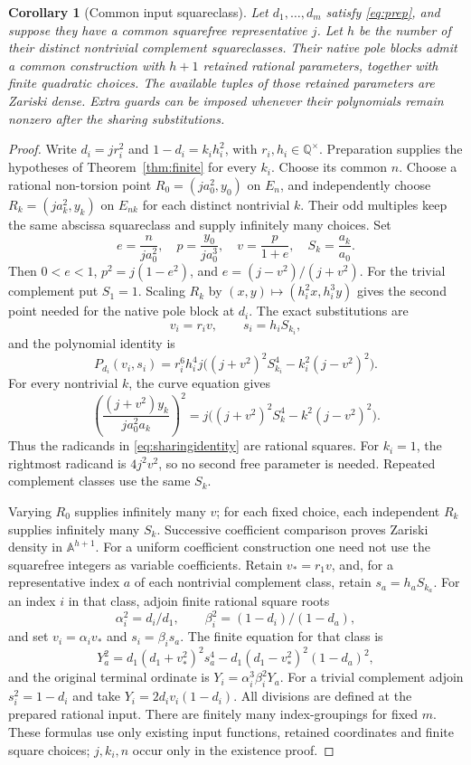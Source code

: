 \documentclass[11pt,a4paper]{article}
\newtheorem{corollary}[theorem]{Corollary}
\theoremstyle{remark}\newtheorem{remark}[theorem]{Remark}
\newcommand{\Q}{\mathbb Q}\newcommand{\Z}{\mathbb Z}\newcommand{\F}{\mathbb F}
\begin{document}
\begin{corollary}[Common input squareclass]\label{cor:sharing}
Let $d_1,\ldots,d_m$ satisfy \eqref{eq:prep}, and suppose they
have a common squarefree representative $j$. Let $h$ be the number
of their distinct nontrivial complement squareclasses.
Their native pole blocks admit a common construction with $h+1$
retained rational parameters, together with finite quadratic choices.
The available tuples of those retained parameters are Zariski dense.
Extra guards can be imposed whenever their polynomials remain
nonzero after the sharing substitutions.
\end{corollary}
\begin{proof}
Write $d_i=j r_i^2$ and $1-d_i=k_i h_i^2$, with
$r_i,h_i\in\Q^\times$. Preparation supplies the hypotheses of
Theorem~\ref{thm:finite} for every $k_i$. Choose its common $n$.
Choose a rational non-torsion point
$R_0=(j a_0^2,y_0)$ on $E_n$, and independently choose
$R_k=(j a_k^2,y_k)$ on $E_{nk}$ for each distinct nontrivial $k$.
Their odd multiples keep the same abscissa squareclass and supply
infinitely many choices. Set
\[
 e=\frac{n}{j a_0^2},\quad
 p=\frac{y_0}{j a_0^3},\quad v=\frac{p}{1+e},\quad
 S_k=\frac{a_k}{a_0}.
\]
Then $0<e<1$, $p^2=j(1-e^2)$, and
$e=(j-v^2)/(j+v^2)$. For the trivial complement put $S_1=1$.
Scaling $R_k$ by $(x,y)\mapsto(h_i^2x,h_i^3y)$ gives the
second point needed for the native pole block at $d_i$.
The exact substitutions are
\[
 v_i=r_i v,\qquad s_i=h_iS_{k_i},
\]
and the polynomial identity is
\begin{equation}\label{eq:sharingidentity}
 P_{d_i}(v_i,s_i)=r_i^6h_i^4j
 \bigl((j+v^2)^2S_{k_i}^4-k_i^2(j-v^2)^2\bigr).
\end{equation}
For every nontrivial $k$, the curve equation gives
\[
 \left(\frac{(j+v^2)y_k}{j a_0^2a_k}\right)^2
 =j\bigl((j+v^2)^2S_k^4-k^2(j-v^2)^2\bigr).
\]
Thus the radicands in \eqref{eq:sharingidentity} are rational squares.
For $k_i=1$, the rightmost radicand is $4j^2v^2$,
so no second free parameter is needed. Repeated complement classes
use the same $S_k$.

Varying $R_0$ supplies infinitely many $v$; for each fixed choice,
each independent $R_k$ supplies infinitely many $S_k$. Successive
coefficient comparison proves Zariski density in $\mathbb A^{h+1}$.
For a uniform coefficient construction one need not use the
squarefree integers as variable coefficients. Retain $v_*=r_1v$,
and, for a representative index $a$ of each nontrivial complement
class, retain $s_a=h_aS_{k_a}$. For an index $i$ in that class,
adjoin finite rational square roots
\[
 \alpha_i^2=d_i/d_1,\qquad
 \beta_i^2=(1-d_i)/(1-d_a),
\]
and set $v_i=\alpha_i v_*$ and $s_i=\beta_i s_a$.
The finite equation for that class is
\[
 Y_a^2=d_1(d_1+v_*^2)^2s_a^4
       -d_1(d_1-v_*^2)^2(1-d_a)^2,
\]
and the original terminal ordinate is
$Y_i=\alpha_i^3\beta_i^2Y_a$.
For a trivial complement adjoin $s_i^2=1-d_i$ and take
$Y_i=2d_iv_i(1-d_i)$.
All divisions are defined at the prepared rational input.
There are finitely many index-groupings for fixed $m$.
These formulas use only existing input functions, retained coordinates
and finite square choices; $j,k_i,n$ occur only in the existence proof.
\end{proof}
\end{document}
